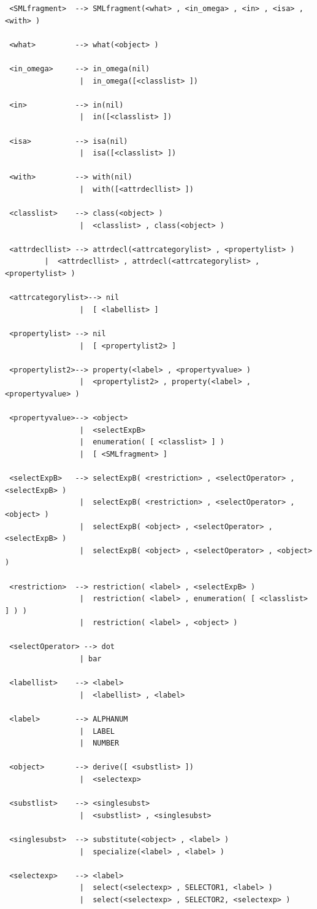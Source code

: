 {\small
\begin{verbatim}
 <SMLfragment>  --> SMLfragment(<what> , <in_omega> , <in> , <isa> , <with> )

 <what>         --> what(<object> )

 <in_omega>     --> in_omega(nil)
                 |  in_omega([<classlist> ])

 <in>           --> in(nil)
                 |  in([<classlist> ])

 <isa>          --> isa(nil)
                 |  isa([<classlist> ])

 <with>         --> with(nil)
                 |  with([<attrdecllist> ])

 <classlist>    --> class(<object> )
                 |  <classlist> , class(<object> )

 <attrdecllist> --> attrdecl(<attrcategorylist> , <propertylist> )
         |  <attrdecllist> , attrdecl(<attrcategorylist> , <propertylist> )

 <attrcategorylist>--> nil
                 |  [ <labellist> ]

 <propertylist> --> nil
                 |  [ <propertylist2> ]

 <propertylist2>--> property(<label> , <propertyvalue> )
                 |  <propertylist2> , property(<label> , <propertyvalue> )

 <propertyvalue>--> <object>
                 |  <selectExpB>
                 |  enumeration( [ <classlist> ] )
                 |  [ <SMLfragment> ]

 <selectExpB>   --> selectExpB( <restriction> , <selectOperator> , <selectExpB> )
                 |  selectExpB( <restriction> , <selectOperator> , <object> )
                 |  selectExpB( <object> , <selectOperator> , <selectExpB> )
                 |  selectExpB( <object> , <selectOperator> , <object> )

 <restriction>  --> restriction( <label> , <selectExpB> )
                 |  restriction( <label> , enumeration( [ <classlist> ] ) )
                 |  restriction( <label> , <object> )

 <selectOperator> --> dot
                 | bar

 <labellist>    --> <label>
                 |  <labellist> , <label>

 <label>        --> ALPHANUM
                 |  LABEL
                 |  NUMBER

 <object>       --> derive([ <substlist> ])
                 |  <selectexp>

 <substlist>    --> <singlesubst>
                 |  <substlist> , <singlesubst>

 <singlesubst>  --> substitute(<object> , <label> )
                 |  specialize(<label> , <label> )

 <selectexp>    --> <label>
                 |  select(<selectexp> , SELECTOR1, <label> )
                 |  select(<selectexp> , SELECTOR2, <selectexp> )

\end{verbatim}
}

